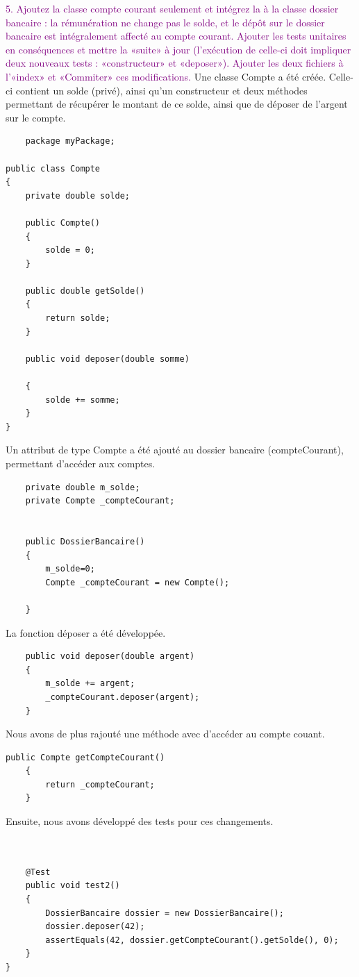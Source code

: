 \documentclass{article}
\begin{document}
\newline
\bigskip
\textcolor{Purple}{5. Ajoutez la classe compte courant seulement et intégrez la à la classe dossier bancaire : la
rémunération ne change pas le solde, et le dépôt sur le dossier bancaire est intégralement
affecté au compte courant. Ajouter les tests unitaires en conséquences et mettre la «suite»
à jour (l’exécution de celle-ci doit impliquer deux nouveaux tests : «constructeur» et «deposer»). Ajouter les deux fichiers à l’«index» et «Commiter» ces modifications.}
\newline
Une classe Compte a été créée. Celle-ci contient un solde (privé), ainsi qu'un constructeur et deux méthodes permettant de récupérer
le montant de ce solde, ainsi que de déposer de l'argent sur le compte.
\begin{lstlisting}
    package myPackage;

public class Compte
{
	private double solde;
	
	public Compte() 
	{
		solde = 0;
	}
	
	public double getSolde() 
	{
		return solde;
	}
	
	public void deposer(double somme) 
   
	{
		solde += somme;
	}
}
\end{lstlisting}
Un attribut de type Compte a été ajouté au dossier bancaire (compteCourant), permettant d'accéder aux comptes.
\begin{lstlisting}
    private double m_solde;
	private Compte _compteCourant;
	
	
    public DossierBancaire()
    {
    	m_solde=0;
    	Compte _compteCourant = new Compte();
    	
    }
\end{lstlisting}
La fonction déposer a été développée.
\begin{lstlisting}
    public void deposer(double argent)
    {
    	m_solde += argent;
    	_compteCourant.deposer(argent);
    }
\end{lstlisting}
Nous avons de plus rajouté une méthode avec d'accéder au compte couant.

\begin{lstlisting}
public Compte getCompteCourant()
    {
    	return _compteCourant;
    }
\end{lstlisting}


Ensuite, nous avons développé des tests pour ces changements.
\begin{lstlisting}

	
	@Test  
	public void test2() 
	{
		DossierBancaire dossier = new DossierBancaire();
		dossier.deposer(42);
		assertEquals(42, dossier.getCompteCourant().getSolde(), 0);		
	}
}
\end{lstlisting}
\end{document}
